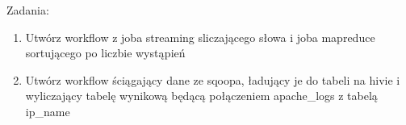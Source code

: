 \documentclass[11pt]{article}
\begin{document}
\pagebreak
Zadania:
\begin{enumerate}
\item Utwórz workflow z joba streaming sliczającego słowa i joba mapreduce sortującego po liczbie wystąpień
\item Utwórz workflow ściągający dane ze sqoopa, ładujący je do tabeli na hivie i wyliczający tabelę wynikową będącą połączeniem apache_logs z tabelą ip_name
\end{enumerate}
\end{document}
